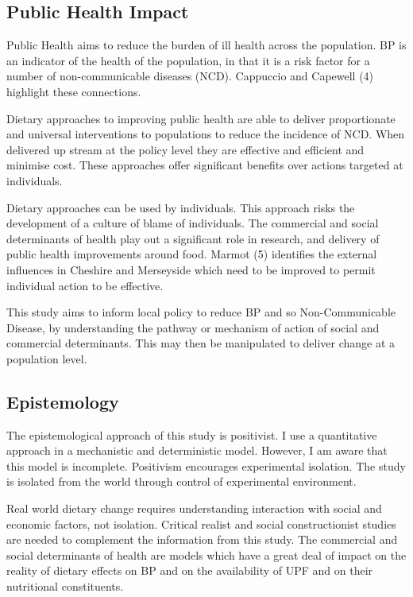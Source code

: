 \documentclass[
]{article}
\begin{document}
\hypertarget{public-health-impact}{%
\subsection{Public Health Impact}\label{public-health-impact}}

Public Health aims to reduce the burden of ill health across the
population. BP is an indicator of the health of the population, in that
it is a risk factor for a number of non-communicable diseases (NCD).
Cappuccio and Capewell (4) highlight these connections.

Dietary approaches to improving public health are able to deliver
proportionate and universal interventions to populations to reduce the
incidence of NCD. When delivered up stream at the policy level they are
effective and efficient and minimise cost. These approaches offer
significant benefits over actions targeted at individuals.

Dietary approaches can be used by individuals. This approach risks the
development of a culture of blame of individuals. The commercial and
social determinants of health play out a significant role in research,
and delivery of public health improvements around food. Marmot (5)
identifies the external influences in Cheshire and Merseyside which need
to be improved to permit individual action to be effective.

This study aims to inform local policy to reduce BP and so
Non-Communicable Disease, by understanding the pathway or mechanism of
action of social and commercial determinants. This may then be
manipulated to deliver change at a population level.

\hypertarget{epistemology}{%
\subsection{Epistemology}\label{epistemology}}

The epistemological approach of this study is positivist. I use a
quantitative approach in a mechanistic and deterministic model. However,
I am aware that this model is incomplete. Positivism encourages
experimental isolation. The study is isolated from the world through
control of experimental environment.

Real world dietary change requires understanding interaction with social
and economic factors, not isolation. Critical realist and social
constructionist studies are needed to complement the information from
this study. The commercial and social determinants of health are models
which have a great deal of impact on the reality of dietary effects on
BP and on the availability of UPF and on their nutritional constituents.
\end{document}
